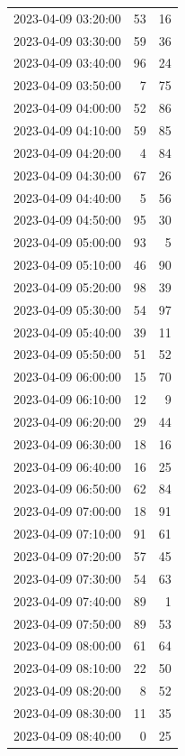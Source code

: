 \documentclass[
  letterpaper,
  DIV=11,
  numbers=noendperiod]{scrartcl}
\begin{document}
\begin{tabular}{lrr}
2023-04-09 03:20:00 &    53 &    16 \\
2023-04-09 03:30:00 &    59 &    36 \\
2023-04-09 03:40:00 &    96 &    24 \\
2023-04-09 03:50:00 &     7 &    75 \\
2023-04-09 04:00:00 &    52 &    86 \\
2023-04-09 04:10:00 &    59 &    85 \\
2023-04-09 04:20:00 &     4 &    84 \\
2023-04-09 04:30:00 &    67 &    26 \\
2023-04-09 04:40:00 &     5 &    56 \\
2023-04-09 04:50:00 &    95 &    30 \\
2023-04-09 05:00:00 &    93 &     5 \\
2023-04-09 05:10:00 &    46 &    90 \\
2023-04-09 05:20:00 &    98 &    39 \\
2023-04-09 05:30:00 &    54 &    97 \\
2023-04-09 05:40:00 &    39 &    11 \\
2023-04-09 05:50:00 &    51 &    52 \\
2023-04-09 06:00:00 &    15 &    70 \\
2023-04-09 06:10:00 &    12 &     9 \\
2023-04-09 06:20:00 &    29 &    44 \\
2023-04-09 06:30:00 &    18 &    16 \\
2023-04-09 06:40:00 &    16 &    25 \\
2023-04-09 06:50:00 &    62 &    84 \\
2023-04-09 07:00:00 &    18 &    91 \\
2023-04-09 07:10:00 &    91 &    61 \\
2023-04-09 07:20:00 &    57 &    45 \\
2023-04-09 07:30:00 &    54 &    63 \\
2023-04-09 07:40:00 &    89 &     1 \\
2023-04-09 07:50:00 &    89 &    53 \\
2023-04-09 08:00:00 &    61 &    64 \\
2023-04-09 08:10:00 &    22 &    50 \\
2023-04-09 08:20:00 &     8 &    52 \\
2023-04-09 08:30:00 &    11 &    35 \\
2023-04-09 08:40:00 &     0 &    25 \\

\end{tabular}
\end{document}
